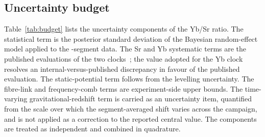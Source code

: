 \subsection*{Uncertainty budget}

Table~\ref{tab:budget} lists the uncertainty components of the
Yb/Sr ratio. The statistical term is the posterior standard deviation
of the Bayesian random-effect model applied to the \nSeg-segment data.
The Sr and Yb systematic terms are the published evaluations of the two
clocks~\citep{jia2026sr, zhu2026yb}; the value adopted for the Yb clock
resolves an internal-versus-published discrepancy in favour of the
published evaluation. The static-potential term follows from the
levelling uncertainty. The fibre-link and frequency-comb terms are
experiment-side upper bounds. The time-varying
gravitational-redshift term is carried as an uncertainty item,
quantified from the scale over which the segment-averaged shift varies
across the campaign, and is not applied as a correction to the reported
central value. The components are treated as independent and combined
in quadrature.
